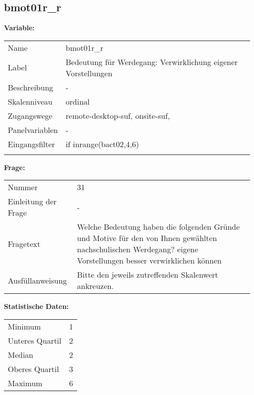 	
	
	\subsection{bmot01r\_r}
	\label{subSection:bmot01r_r}

	\noindent\textbf{Variable:}\\
		\begin{tabular}{lL{11.3cm}}
			\label{tableVariable:bmot01r_r}
			Name & bmot01r\_r \\
			Label & Bedeutung für Werdegang: Verwirklichung eigener Vorstellungen \\
			Beschreibung & - \\
			Skalenniveau & ordinal \\
			Zugangswege &
				remote-desktop-suf,
				onsite-suf,
 \\
			Panelvariablen & -
			 \\
			Eingangsfilter & if inrange(bact02,4,6)  \\
 \\
		\end{tabular}

		\vspace*{1 cm}
		\noindent\textbf{Frage:}\\
		\begin{tabular}{lL{11.3cm}}
			\label{tableQuestion:bmot01r_r}
			Nummer & 31 \\
			Einleitung der Frage & - \\
			Fragetext & Welche Bedeutung haben die folgenden Gründe und Motive für den von Ihnen gewählten nachschulischen Werdegang?
eigene Vorstellungen besser verwirklichen können \\
			Ausfüllanweisung & Bitte den jeweils zutreffenden Skalenwert ankreuzen. \\
		\end{tabular}


		\vspace*{1 cm}
		\noindent\textbf{Statistische Daten:}\\
			\begin{tabular}{ll}
				\label{tableStatistics:bmot01r_r}
					Minimum & 1 \\
					Unteres Quartil & 2 \\
					Median & 2 \\
					Oberes Quartil & 3 \\
					Maximum & 6 \\
			\end{tabular}



